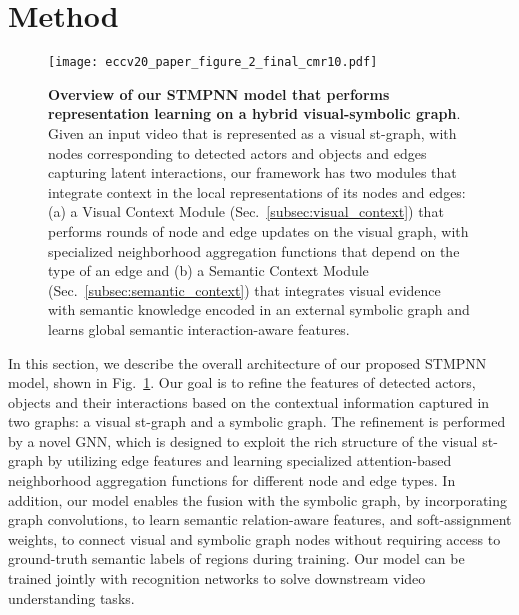 \documentclass[runningheads]{llncs}
\begin{document}
\section{Method}
\label{sec:method}
\begin{figure}[ht]
\begin{center}
 \texttt{[image: eccv20\_paper\_figure\_2\_final\_cmr10.pdf]}
\end{center}
   \caption{\textbf{Overview of our \ac{STMPNN} model that performs representation learning on a hybrid visual-symbolic graph}. Given an input video that is represented as a visual st-graph, with nodes corresponding to detected actors and objects and edges capturing latent interactions, our framework has two modules that integrate context in the local representations of its nodes and edges: (a) a Visual Context Module (Sec.~\ref{subsec:visual_context}) that performs  rounds of node and edge updates on the visual graph, with specialized neighborhood aggregation functions that depend on the type of an edge and (b) a Semantic Context Module (Sec.~\ref{subsec:semantic_context}) that integrates visual evidence with semantic knowledge encoded in an external symbolic graph and learns global semantic interaction-aware features.
}
\label{fig:overview}
\end{figure}
In this section, we describe the overall architecture of our proposed \ac{STMPNN} model, shown in Fig.~\ref{fig:overview}. Our goal is to refine the features of detected actors, objects and their interactions based on the contextual information captured in two graphs: a visual st-graph
and a symbolic graph. The refinement is performed by a novel GNN, which is designed to exploit the rich structure of the visual st-graph by utilizing edge features and learning specialized attention-based neighborhood aggregation functions for different node and edge types.  In addition, our model enables the fusion with the symbolic graph, by incorporating graph convolutions, to learn semantic relation-aware features, and soft-assignment weights, to connect visual and symbolic graph nodes without requiring access to ground-truth semantic labels of regions during training. Our model can be trained jointly with recognition networks to solve downstream video understanding tasks.
\end{document}
